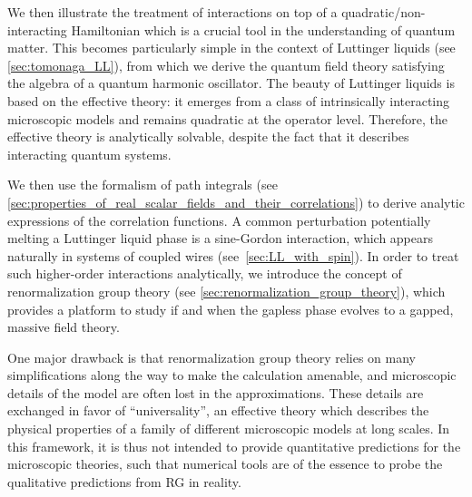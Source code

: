 We then illustrate the treatment of interactions on top of a quadratic/non-interacting Hamiltonian which is a crucial tool in the understanding of quantum matter.
This becomes particularly simple in the context of Luttinger liquids (see \cref{sec:tomonaga_LL}), from which we derive the quantum field theory satisfying the algebra of a quantum harmonic oscillator.
The beauty of Luttinger liquids is based on the effective theory: it emerges from a class of intrinsically interacting microscopic models and remains quadratic at the operator level.
Therefore, the effective theory is analytically solvable, despite the fact that it describes interacting quantum systems.

We then use the formalism of path integrals (see \cref{sec:properties_of_real_scalar_fields_and_their_correlations}) to derive analytic expressions of the correlation functions.
A common perturbation potentially melting a Luttinger liquid phase is a sine-Gordon interaction, which appears naturally in systems of coupled wires (see~\cref{sec:LL_with_spin}).
In order to treat such higher-order interactions analytically, we introduce the concept of renormalization group theory (see \cref{sec:renormalization_group_theory}), which provides a platform to study if and when the gapless phase evolves to a gapped, massive field theory.

One major drawback is that renormalization group theory relies on many simplifications along the way to make the calculation amenable, and microscopic details of the model are often lost in the approximations.
These details are exchanged in favor of ``universality'', an effective theory which describes the physical properties of a family of different microscopic models at long scales.
In this framework, it is thus not intended to provide quantitative predictions for the microscopic theories, such that numerical tools are of the essence to probe the qualitative predictions from RG in reality.

